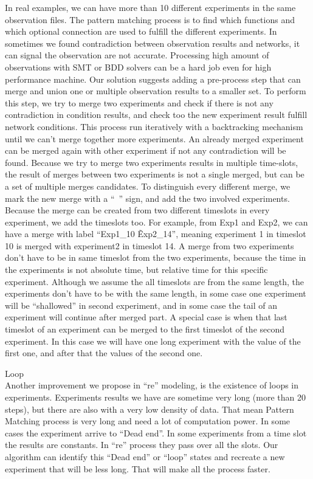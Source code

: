 \documentclass{article}      %
\newcounter{ct}
\begin{document}
In real examples, we can have more than 10 different experiments in the same observation files. The pattern matching process is to find which functions and which optional connection are used to fulfill the different experiments. In sometimes we found contradiction between observation results and networks, it can signal the observation are not accurate. 
Processing high amount of observations with SMT or BDD solvers can be a hard job even for high performance machine.
Our solution suggests adding a pre-process step that can merge and union one or multiple observation results to a smaller set. To perform this step, we try to merge two experiments and check if there is not any contradiction in condition results, and check too the new experiment result fulfill network conditions. This process run iteratively with a backtracking mechanism until we can’t merge together more experiments. An already merged experiment can be merged again with other experiment if not any contradiction will be found. Because we try to merge two experiments results in multiple time-slots, the result of merges between two experiments is not a single merged, but can be a set of multiple merges candidates. To distinguish every different merge, we mark the new merge with a “~” sign, and add the two involved experiments. Because the merge can be created from two different timeslots in every experiment, we add the timeslots too. For example, from Exp1 and Exp2, we can have a merge with label “Exp1\_10 \~ Exp2\_14”, meaning experiment 1 in timeslot 10 is merged with experiment2 in timeslot 14.
A merge from two experiments don’t have to be in same timeslot from the two experiments, because the time in the experiments is not absolute time, but relative time for this specific experiment. Although we assume the all timeslots are from the same length, the experiments don’t have to be with the same length, in some case one experiment will be “shallowed” in second experiment, and in some case the tail of an experiment will continue after merged part. A special case is when that last timeslot of an experiment can be merged to the first timeslot of the second experiment. In this case we will have one long experiment with the value of the first one, and after that the values of the second one.

\large Loop \\
Another improvement we propose in “re” modeling, is the existence of loops in experiments. Experiments results we have are sometime very long (more than 20 steps), but there are also with a very low density of data.  That mean Pattern Matching process is very long and need a lot of computation power. In some cases the experiment arrive to “Dead end”. In some experiments from a time slot the results are constants. In “re” process they pass over all the slots. Our algorithm can identify this “Dead end” or “loop” states and recreate a new experiment that will be less long. That will make all the process faster.
\end{document}
